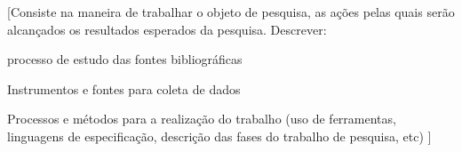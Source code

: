 
[Consiste na maneira de trabalhar o objeto de pesquisa, as ações pelas quais serão alcançados os resultados esperados da pesquisa.
Descrever:

processo de estudo das fontes bibliográficas

Instrumentos e fontes para coleta de dados

Processos e métodos para a realização do trabalho (uso de ferramentas, linguagens de especificação, descrição das fases do trabalho de pesquisa, etc)
]